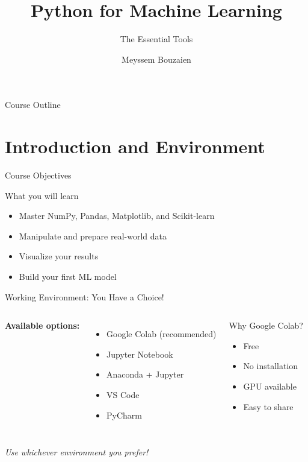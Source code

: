 \documentclass[aspectratio=169]{beamer}
\title{Python for Machine Learning}
\subtitle{The Essential Tools}
\author{Meyssem Bouzaien}
\institute{Academic Year: 2025 - 2026}
\date{}
\begin{document}
\frame{\titlepage}

\begin{frame}{Course Outline}
\tableofcontents
\end{frame}

\section{Introduction and Environment}

\begin{frame}{Course Objectives}
\begin{block}{What you will learn}
\begin{itemize}
    \item Master NumPy, Pandas, Matplotlib, and Scikit-learn
    \item Manipulate and prepare real-world data
    \item Visualize your results
    \item Build your first ML model
\end{itemize}
\end{block}


\end{frame}

\begin{frame}{Working Environment: You Have a Choice!}
\begin{columns}[T]
\textbf{Available options:}
\begin{itemize}
    \item \alert{Google Colab} (recommended)
    \item Jupyter Notebook
    \item Anaconda + Jupyter
    \item VS Code
    \item PyCharm
\end{itemize}

\begin{block}{Why Google Colab?}
\begin{itemize}
    \item Free
    \item No installation
    \item GPU available
    \item Easy to share
\end{itemize}
\end{block}
\end{columns}

\vspace{0.4cm}
\footnotesize{\textit{Use whichever environment you prefer!}}
\end{frame}
\end{document}
